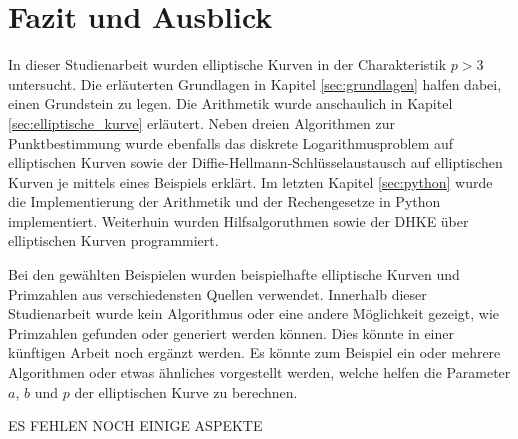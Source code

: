 \chapter{Fazit und Ausblick}
In dieser Studienarbeit wurden elliptische Kurven in der Charakteristik $p > 3$ untersucht. Die erläuterten Grundlagen in Kapitel \ref{sec:grundlagen} halfen dabei, einen Grundstein zu legen. Die Arithmetik wurde anschaulich in Kapitel \ref{sec:elliptische_kurve} erläutert. Neben dreien Algorithmen zur Punktbestimmung wurde ebenfalls das diskrete Logarithmusproblem auf elliptischen Kurven sowie der Diffie-Hellmann-Schlüsselaustausch auf elliptischen Kurven je mittels eines Beispiels erklärt. Im letzten Kapitel \ref{sec:python} wurde die Implementierung der Arithmetik und der Rechengesetze in Python implementiert. Weiterhuin wurden Hilfsalgoruthmen sowie der DHKE über elliptischen Kurven programmiert. 

Bei den gewählten Beispielen wurden beispielhafte elliptische Kurven und Primzahlen aus verschiedensten Quellen verwendet. Innerhalb dieser Studienarbeit wurde kein Algorithmus oder eine andere Möglichkeit gezeigt, wie Primzahlen gefunden oder generiert werden können. Dies könnte in einer künftigen Arbeit noch ergänzt werden. Es könnte zum Beispiel ein oder mehrere Algorithmen oder etwas ähnliches vorgestellt werden, welche helfen die Parameter $a$, $b$ und $p$ der elliptischen Kurve zu berechnen.

ES FEHLEN NOCH EINIGE ASPEKTE